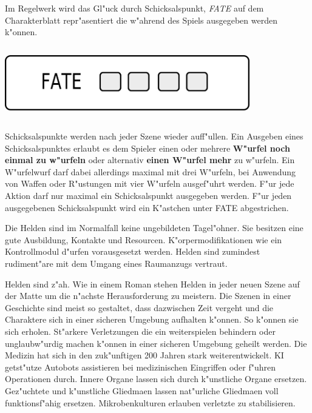 \begin{column}[l]{0.52}
    Im Regelwerk wird das Gl"uck durch Schicksalspunkt, \emph{FATE} auf dem Charakterblatt repr"asentiert die w"ahrend des Spiels ausgegeben werden k"onnen.
\end{column}
\begin{column}[r]{0.48}
    \centering
    \includegraphics[width=0.80\textwidth]{images/character_fate.png}    
\end{column}

Schicksalspunkte werden nach jeder Szene wieder auff"ullen. Ein Ausgeben eines Schicksalspunktes erlaubt es dem Spieler einen oder mehrere \textbf{W"urfel noch einmal zu w"urfeln} oder alternativ \textbf{einen W"urfel mehr} zu w"urfeln. Ein W"urfelwurf darf dabei allerdings maximal mit drei W"urfeln, bei Anwendung von Waffen oder R"ustungen mit vier W"urfeln ausgef"uhrt werden. F"ur jede Aktion darf nur maximal ein Schicksalspunkt ausgegeben werden. F"ur jeden ausgegebenen Schicksalspunkt wird ein K"astchen unter FATE abgestrichen.

Die Helden sind im Normalfall keine ungebildeten Tagel"ohner. Sie besitzen eine gute Ausbildung, Kontakte und Resourcen. K"orpermodifikationen wie ein Kontrollmodul d"urfen vorausgesetzt werden. Helden sind zumindest rudiment"are mit dem Umgang eines Raumanzugs vertraut.

Helden sind z"ah. Wie in einem Roman stehen Helden in jeder neuen Szene auf der Matte um die n"achste Herausforderung zu meistern. Die Szenen in einer Geschichte sind meist so gestaltet, dass dazwischen Zeit vergeht und die Charaktere sich in einer sicheren Umgebung aufhalten k"onnen. So k"onnen sie sich erholen. St"arkere Verletzungen die ein weiterspielen behindern oder unglaubw"urdig machen k"onnen in einer sicheren Umgebung geheilt werden. Die Medizin hat sich in den zuk"unftigen 200 Jahren stark weiterentwickelt. KI getst"utze Autobots assistieren bei medizinischen Eingriffen oder f"uhren Operationen durch. Innere Organe lassen sich durch k"unstliche Organe ersetzen. Gez"uchtete und k"unstliche Gliedma\3en lassen nat"urliche Gliedma\3en voll funktionsf"ahig ersetzen. Mikrobenkulturen erlauben verletzte zu stabilisieren.


